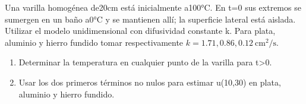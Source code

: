 Una varilla homogénea de20cm está inicialmente a100°C. En t=0 sus extremos se sumergen
en un baño a0°C y se mantienen allí; la superficie lateral está aislada.
Utilizar el modelo unidimensional con difusividad constante k.
Para plata, aluminio y hierro fundido tomar respectivamente
\(k=1.71,0.86,0.12\ \mathrm{cm^2/s}\).

\begin{enumerate}[label=(\alph*),ref=\alph*,leftmargin=*]
\item Determinar la temperatura en cualquier punto de la varilla para t>0.
\item Usar los dos primeros términos no nulos para estimar u(10,30) en plata, aluminio y hierro fundido.
\end{enumerate}

